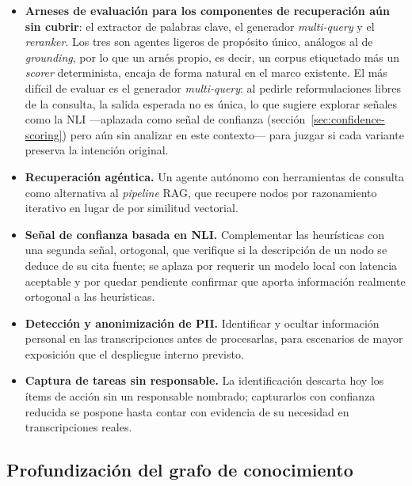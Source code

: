 \begin{itemize}
  \item \textbf{Arneses de evaluación para los componentes de recuperación aún sin cubrir}: el
        extractor de palabras clave, el generador \textit{multi-query} y el \textit{reranker}.
        Los tres son agentes ligeros de propósito único, análogos al de \textit{grounding}, por
        lo que un arnés propio, es decir, un corpus etiquetado más un \textit{scorer} determinista,
        encaja de forma natural en el marco existente. El más difícil de evaluar es el generador
        \textit{multi-query}: al pedirle reformulaciones libres de la consulta, la salida esperada
        no es única, lo que sugiere explorar señales como la \acs{NLI} —aplazada como señal de
        confianza (sección~\ref{sec:confidence-scoring}) pero aún sin analizar en este contexto—
        para juzgar si cada variante preserva la intención original.

  \item \textbf{Recuperación agéntica.} Un agente autónomo con herramientas de consulta como
        alternativa al \textit{pipeline} \ac{RAG}, que recupere nodos por razonamiento iterativo en
        lugar de por similitud vectorial.

  \item \textbf{Señal de confianza basada en \acs{NLI}.} Complementar las heurísticas con una
        segunda señal, ortogonal, que verifique si la descripción de un nodo se deduce de su cita
        fuente; se aplaza por requerir un modelo local con latencia aceptable y por quedar
        pendiente confirmar que aporta información realmente ortogonal a las heurísticas.

  \item \textbf{Detección y anonimización de PII.} Identificar y ocultar información personal en
        las transcripciones antes de procesarlas, para escenarios de mayor exposición que el
        despliegue interno previsto.

  \item \textbf{Captura de tareas sin responsable.} La identificación descarta hoy los ítems de
        acción sin un responsable nombrado; capturarlos con confianza reducida se pospone hasta
        contar con evidencia de su necesidad en transcripciones reales.
\end{itemize}

\subsection{Profundización del grafo de conocimiento}

